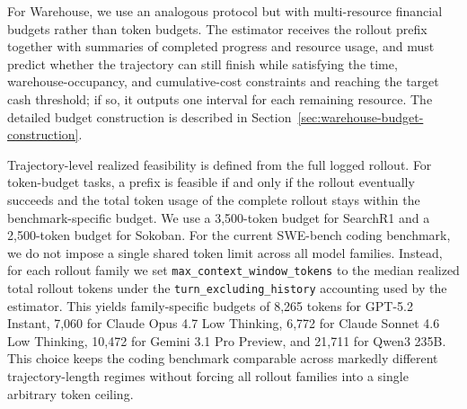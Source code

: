 For Warehouse, we use an analogous protocol but with multi-resource financial budgets rather than token budgets. The estimator receives the rollout prefix together with summaries of completed progress and resource usage, and must predict whether the trajectory can still finish while satisfying the time, warehouse-occupancy, and cumulative-cost constraints and reaching the target cash threshold; if so, it outputs one interval for each remaining resource. The detailed budget construction is described in Section~\ref{sec:warehouse-budget-construction}.

Trajectory-level realized feasibility is defined from the full logged rollout. For token-budget tasks, a prefix is feasible if and only if the rollout eventually succeeds and the total token usage of the complete rollout stays within the benchmark-specific budget. We use a 3{,}500-token budget for SearchR1 and a 2{,}500-token budget for Sokoban. For the current SWE-bench coding benchmark, we do not impose a single shared token limit across all model families. Instead, for each rollout family we set \texttt{max\_context\_window\_tokens} to the median realized total rollout tokens under the \texttt{turn\_excluding\_history} accounting used by the estimator. This yields family-specific budgets of 8{,}265 tokens for GPT-5.2 Instant, 7{,}060 for Claude Opus 4.7 Low Thinking, 6{,}772 for Claude Sonnet 4.6 Low Thinking, 10{,}472 for Gemini 3.1 Pro Preview, and 21{,}711 for Qwen3 235B. This choice keeps the coding benchmark comparable across markedly different trajectory-length regimes without forcing all rollout families into a single arbitrary token ceiling.

